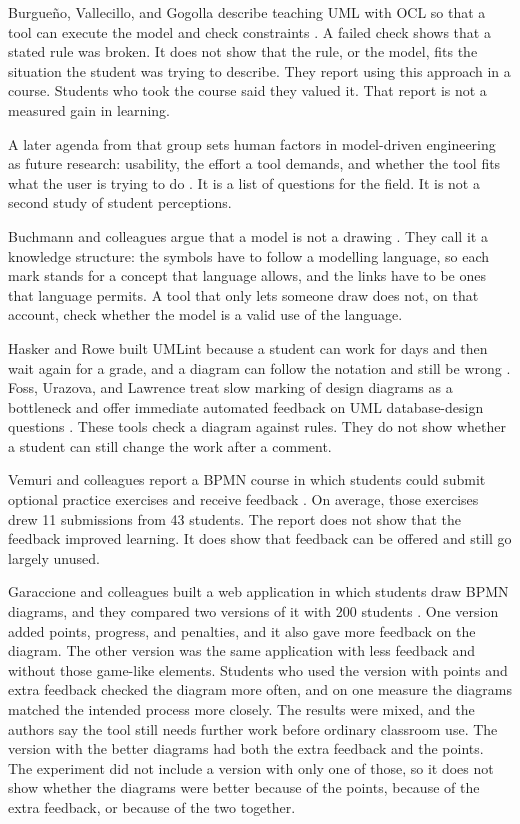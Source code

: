 Burgue{\~n}o, Vallecillo, and Gogolla describe teaching UML with OCL so that a tool can execute the model and check constraints \cite{burgueno2018teaching}. A failed check shows that a stated rule was broken. It does not show that the rule, or the model, fits the situation the student was trying to describe. They report using this approach in a course. Students who took the course said they valued it. That report is not a measured gain in learning.

A later agenda from that group sets human factors in model-driven engineering as future research: usability, the effort a tool demands, and whether the tool fits what the user is trying to do \cite{human-factors-mde}. It is a list of questions for the field. It is not a second study of student perceptions.

Buchmann and colleagues argue that a model is not a drawing \cite{buchmann2019conceptual}. They call it a knowledge structure: the symbols have to follow a modelling language, so each mark stands for a concept that language allows, and the links have to be ones that language permits. A tool that only lets someone draw does not, on that account, check whether the model is a valid use of the language.

Hasker and Rowe built UMLint because a student can work for days and then wait again for a grade, and a diagram can follow the notation and still be wrong \cite{hasker2011umlint}. Foss, Urazova, and Lawrence treat slow marking of design diagrams as a bottleneck and offer immediate automated feedback on UML database-design questions \cite{foss2022autoer}. These tools check a diagram against rules. They do not show whether a student can still change the work after a comment.

Vemuri and colleagues report a BPMN course in which students could submit optional practice exercises and receive feedback \cite{vemuri2023feedback}. On average, those exercises drew 11 submissions from 43 students. The report does not show that the feedback improved learning. It does show that feedback can be offered and still go largely unused.

Garaccione and colleagues built a web application in which students draw BPMN diagrams, and they compared two versions of it with 200 students \cite{garaccione2024gamification}. One version added points, progress, and penalties, and it also gave more feedback on the diagram. The other version was the same application with less feedback and without those game-like elements. Students who used the version with points and extra feedback checked the diagram more often, and on one measure the diagrams matched the intended process more closely. The results were mixed, and the authors say the tool still needs further work before ordinary classroom use. The version with the better diagrams had both the extra feedback and the points. The experiment did not include a version with only one of those, so it does not show whether the diagrams were better because of the points, because of the extra feedback, or because of the two together.

